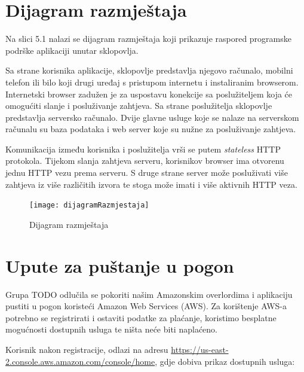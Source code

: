 			\eject 
		
		
		\section{Dijagram razmještaja}
			
			Na slici 5.1 nalazi se dijagram razmještaja koji prikazuje raspored programske podrške aplikaciji unutar sklopovlja.
			
			Sa strane korisnika aplikacije, sklopovlje predstavlja njegovo računalo, mobilni telefon ili bilo koji drugi uređaj s pristupom internetu i instaliranim browserom.
			Internetski browser zadužen je za uspostavu konekcije sa poslužiteljem koja će omogućiti slanje i posluživanje zahtjeva.
			Sa strane poslužitelja sklopovlje predstavlja serversko računalo.
			Dvije glavne usluge koje se nalaze na serverskom računalu su baza podataka i web server koje su nužne za posluživanje zahtjeva.
			
			Komunikacija između korisnika i poslužitelja vrši se putem \textit{stateless} HTTP protokola. 
			Tijekom slanja zahtjeva serveru, korisnikov browser ima otvorenu jednu HTTP vezu prema serveru.
			S druge strane server može posluživati više zahtjeva iz više različitih izvora te stoga može imati i više aktivnih HTTP veza.
			
			\begin{figure}[h]
				\texttt{[image: dijagramRazmjestaja]}
				\caption{Dijagram razmještaja}
			\end{figure} 
			
			\eject 
		
		\section{Upute za puštanje u pogon}
		
			Grupa TODO odlučila se pokoriti našim Amazonskim overlordima i aplikaciju pustiti u pogon koristeći Amazon Web Services (AWS). Za korištenje AWS-a potrebno se registrirati i ostaviti podatke za plaćanje, koristimo besplatne mogućnosti dostupnih usluga te ništa neće biti naplaćeno. 
			
			Korisnik nakon registracije, odlazi na adresu \url{https://us-east-2.console.aws.amazon.com/console/home}, gdje dobiva prikaz dostupnih usluga:
			
